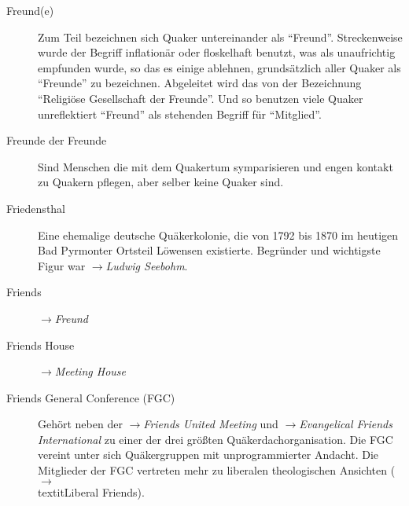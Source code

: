 \begin{description}
 \item[Freund(e)] Zum Teil bezeichnen sich Quaker untereinander als "`Freund"'. Streckenweise wurde der Begriff inflationär oder floskelhaft benutzt, was
 als unaufrichtig empfunden wurde, so das es einige ablehnen, grundsätzlich
 aller Quaker als "`Freunde"' zu bezeichnen. Abgeleitet wird das von der
 Bezeichnung "`Religiöse Gesellschaft der Freunde"'. Und so benutzen viele
 Quaker unreflektiert "`Freund"' als stehenden Begriff für "`Mitglied"'.
 
 \item[Freunde der Freunde] Sind Menschen die mit dem Quakertum symparisieren
 und engen kontakt zu Quakern pflegen, aber selber keine Quaker sind.

 \item[Friedensthal] Eine ehemalige deutsche Quäkerkolonie, die von 1792 bis
 1870 im heutigen Bad Pyrmonter Ortsteil Löwensen existierte. Begründer und
 wichtigste Figur war $\to$\textit{Ludwig Seebohm}.

 \item[Friends] $\to$\textit{Freund}

 \item[Friends House] $\to$\textit{Meeting House}

 \item[Friends General Conference (FGC)] Gehört neben der
 $\to$\textit{Friends United Meeting} und $\to$\textit{Evangelical Friends
 International} zu einer der drei größten Quäkerdachorganisation. Die FGC
 vereint unter sich Quäkergruppen mit unprogrammierter Andacht. Die Mitglieder
 der FGC vertreten mehr zu liberalen theologischen Ansichten
 ($\to$\\textit{Liberal Friends}). 




\end{description}

